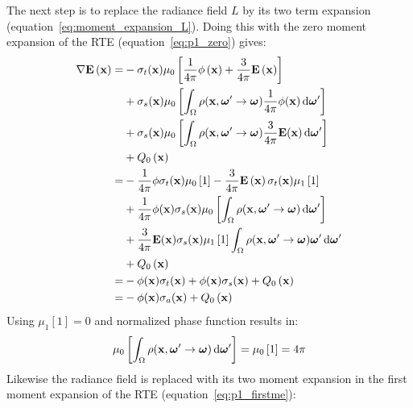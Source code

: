 The next step is to replace the radiance field $L$ by its two term expansion (equation~\ref{eq:moment_expansion_L}). Doing this with the zero moment expansion of the RTE (equation~\ref{eq:p1_zero}) gives:
\begin{align*}
\nabla\boldsymbol{\mathbf{E}}\left(\boldsymbol{\mathbf{x}}\right)=
&
-\sigma_t(\boldsymbol{\mathbf{x}})\mu_0\left[\frac{1}{4\pi}\phi\left(\boldsymbol{\mathbf{x}}\right) + \frac{3}{4\pi}\boldsymbol{\mathbf{E}}\left(\boldsymbol{\mathbf{x}}\right)\right]
\\
&
+\sigma_s(\boldsymbol{\mathbf{x}})\mu_0\left[\int_{\Omega}\rho(\boldsymbol{\mathbf{x}}, \boldsymbol{\mathbf{\omega}}'\rightarrow\boldsymbol{\mathbf{\omega}})\frac{1}{4\pi}\phi(\boldsymbol{\mathbf{x}})\,\mathrm{d}\boldsymbol{\mathbf{\omega}}'\right]
\\
&
+\sigma_s(\boldsymbol{\mathbf{x}})\mu_0\left[\int_{\Omega}\rho(\boldsymbol{\mathbf{x}}, \boldsymbol{\mathbf{\omega}}'\rightarrow\boldsymbol{\mathbf{\omega}})\frac{3}{4\pi}\boldsymbol{\mathbf{E}}(\boldsymbol{\mathbf{x}})\,\mathrm{d}\boldsymbol{\mathbf{\omega}}'\right]
\\
&
\nonumber
+ Q_0\left(\boldsymbol{\mathbf{x}}\right)
\\
=&
-\frac{1}{4\pi}\phi\sigma_t(\boldsymbol{\mathbf{x}})\mu_0\left[1\right] - \frac{3}{4\pi}\boldsymbol{\mathbf{E}}\left(\boldsymbol{\mathbf{x}}\right)\sigma_t(\boldsymbol{\mathbf{x}})\mu_1\left[1\right]
\\
&
+\frac{1}{4\pi}\phi(\boldsymbol{\mathbf{x}})\sigma_s(\boldsymbol{\mathbf{x}})\mu_0\left[\int_{\Omega}\rho(\boldsymbol{\mathbf{x}}, \boldsymbol{\mathbf{\omega}}'\rightarrow\boldsymbol{\mathbf{\omega}})\,\mathrm{d}\boldsymbol{\mathbf{\omega}}'\right]
\\
&
+\frac{3}{4\pi}\boldsymbol{\mathbf{E}}(\boldsymbol{\mathbf{x}})\sigma_s(\boldsymbol{\mathbf{x}})\mu_1\left[1\right]\int_{\Omega}\rho(\boldsymbol{\mathbf{x}}, \boldsymbol{\mathbf{\omega}}'\rightarrow\boldsymbol{\mathbf{\omega}})\boldsymbol{\mathbf{\omega}}'\,\mathrm{d}\boldsymbol{\mathbf{\omega}}'
\\
&
+ Q_0\left(\boldsymbol{\mathbf{x}}\right)
\\
=&
-\phi(\boldsymbol{\mathbf{x}})\sigma_t(\boldsymbol{\mathbf{x}})
+\phi(\boldsymbol{\mathbf{x}})\sigma_s(\boldsymbol{\mathbf{x}})
+Q_0\left(\boldsymbol{\mathbf{x}}\right)
\\
=&
-\phi(\boldsymbol{\mathbf{x}})\sigma_a(\boldsymbol{\mathbf{x}})
+Q_0\left(\boldsymbol{\mathbf{x}}\right)
\end{align*}
Using $\mu_1[1] = 0$ and normalized phase function results in:
\begin{align*}
\mu_0\left[\int_{\Omega}\rho(\boldsymbol{\mathbf{x}}, \boldsymbol{\mathbf{\omega}}'\rightarrow\boldsymbol{\mathbf{\omega}})\,\mathrm{d}\boldsymbol{\mathbf{\omega}}'\right] = \mu_0\left[1\right] = 4\pi
\end{align*}
Likewise the radiance field is replaced with its two moment expansion in the first moment expansion of the RTE (equation~\ref{eq:p1_firstme}):
